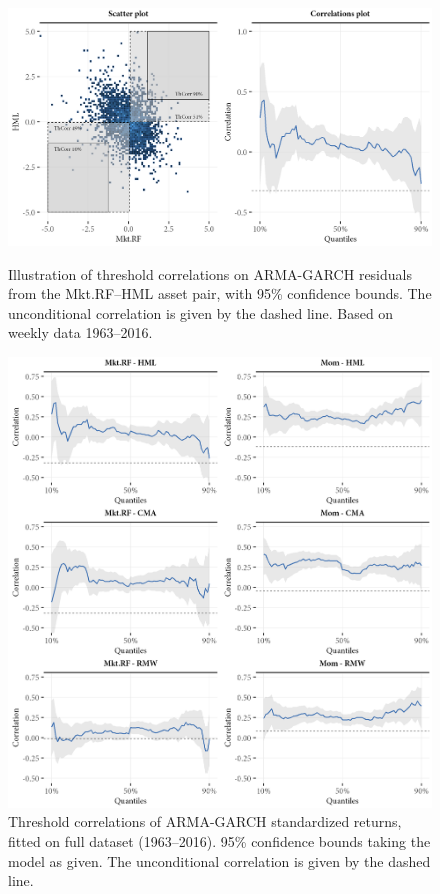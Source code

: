 \begin{figure}[!ht]
  \centering
  \footnotesize
  \caption{Illustration of threshold correlations on ARMA-GARCH residuals from the Mkt.RF--HML asset pair, with 95\% confidence bounds. The unconditional correlation is given by the dashed line. Based on weekly data 1963--2016.}
  \includegraphics[scale=1]{graphics/threshold_explain_res.png}
  \label{fig:illustrate_threshold}
\end{figure}

\begin{figure}[!ht]
  \centering
  \footnotesize
  \includegraphics[scale=1]{graphics/threshold1.png}

  \caption{Threshold correlations of ARMA-GARCH standardized returns, fitted on full dataset (1963--2016). 95\% confidence bounds taking the model as given. The unconditional correlation is given by the dashed line.}
  \label{fig:threshold1}
\end{figure}

